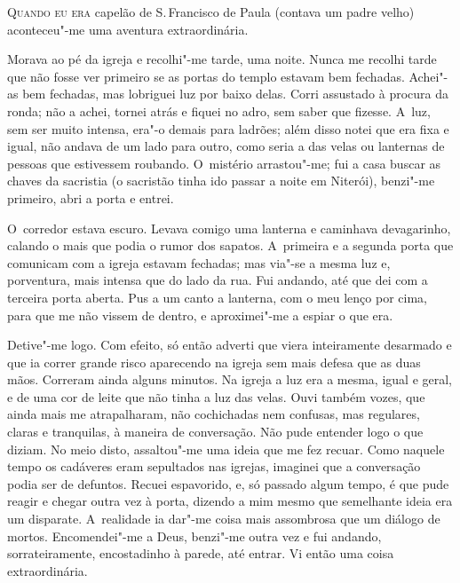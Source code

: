 \begin{linenumbers}

\textsc{Quando eu era} capelão de S.\,Francisco de Paula (contava um padre velho)
aconteceu"-me uma aventura extraordinária.

Morava ao pé da igreja e recolhi"-me tarde, uma noite. Nunca me recolhi
tarde que não fosse ver primeiro se as portas do templo estavam bem
fechadas. Achei"-as bem fechadas, mas lobriguei luz por baixo delas.
Corri assustado à procura da ronda; não a achei, tornei atrás e fiquei
no adro, sem saber que fizesse. A~luz, sem ser muito intensa, era"-o
demais para ladrões; além disso notei que era fixa e igual, não andava
de um lado para outro, como seria a das velas ou lanternas de pessoas
que estivessem roubando. O~mistério arrastou"-me; fui a casa buscar as
chaves da sacristia (o sacristão tinha ido passar a noite em Niterói),
benzi"-me primeiro, abri a porta e entrei.

O~corredor estava escuro. Levava comigo uma lanterna e caminhava
devagarinho, calando o mais que podia o rumor dos sapatos. A~primeira e
a segunda porta que comunicam com a igreja estavam fechadas; mas via"-se
a mesma luz e, porventura, mais intensa que do lado da rua. Fui andando,
até que dei com a terceira porta aberta. Pus a um canto a lanterna, com
o meu lenço por cima, para que me não vissem de dentro, e aproximei"-me a
espiar o que era.

Detive"-me logo. Com efeito, só então adverti que viera inteiramente
desarmado e que ia correr grande risco aparecendo na igreja sem mais
defesa que as duas mãos. Correram ainda alguns minutos. Na igreja a luz
era a mesma, igual e geral, e de uma cor de leite que não tinha a luz
das velas. Ouvi também vozes, que ainda mais me atrapalharam, não
cochichadas nem confusas, mas regulares, claras e tranquilas, à maneira
de conversação. Não pude entender logo o que diziam. No meio disto,
assaltou"-me uma ideia que me fez recuar. Como naquele tempo os cadáveres
eram sepultados nas igrejas, imaginei que a conversação podia ser de
defuntos. Recuei espavorido, e, só passado algum tempo, é que pude
reagir e chegar outra vez à porta, dizendo a mim mesmo que semelhante
ideia era um disparate. A~realidade ia dar"-me coisa mais assombrosa que
um diálogo de mortos. Encomendei"-me a Deus, benzi"-me outra vez e fui
andando, sorrateiramente, encostadinho à parede, até entrar. Vi então
uma coisa extraordinária.


\end{linenumbers}
